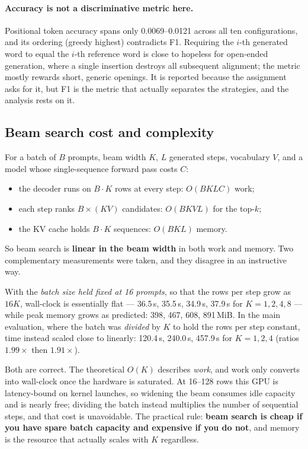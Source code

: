 \documentclass[11pt]{article}
\begin{document}
\paragraph{Accuracy is not a discriminative metric here.} Positional token
accuracy spans only 0.0069--0.0121 across all ten configurations, and its
ordering (greedy highest) contradicts F1. Requiring the $i$-th generated word to
equal the $i$-th reference word is close to hopeless for open-ended generation,
where a single insertion destroys all subsequent alignment; the metric mostly
rewards short, generic openings. It is reported because the assignment asks for
it, but F1 is the metric that actually separates the strategies, and the
analysis rests on it.

\subsection{Beam search cost and complexity}

For a batch of $B$ prompts, beam width $K$, $L$ generated steps, vocabulary $V$,
and a model whose single-sequence forward pass costs $C$:

\begin{itemize}
  \item the decoder runs on $B\!\cdot\!K$ rows at every step: $O(B K L C)$ work;
  \item each step ranks $B \times (KV)$ candidates: $O(B K V L)$ for the top-$k$;
  \item the KV cache holds $B\!\cdot\!K$ sequences: $O(BKL)$ memory.
\end{itemize}

\noindent
So beam search is \textbf{linear in the beam width} in both work and memory. Two
complementary measurements were taken, and they disagree in an instructive way.

With the \emph{batch size held fixed at 16 prompts}, so that the rows per step
grow as $16K$, wall-clock is essentially flat --- 36.5\,s, 35.5\,s, 34.9\,s,
37.9\,s for $K = 1, 2, 4, 8$ --- while peak memory grows as predicted: 398, 467,
608, 891\,MiB. In the main evaluation, where the batch was \emph{divided} by $K$
to hold the rows per step constant, time instead scaled close to linearly:
120.4\,s, 240.0\,s, 457.9\,s for $K = 1, 2, 4$ (ratios $1.99\times$ then
$1.91\times$).

Both are correct. The theoretical $O(K)$ describes \emph{work}, and work only
converts into wall-clock once the hardware is saturated. At 16--128 rows this GPU
is latency-bound on kernel launches, so widening the beam consumes idle capacity
and is nearly free; dividing the batch instead multiplies the number of
sequential steps, and that cost is unavoidable. The practical rule: \textbf{beam
search is cheap if you have spare batch capacity and expensive if you do not},
and memory is the resource that actually scales with $K$ regardless.
\end{document}
